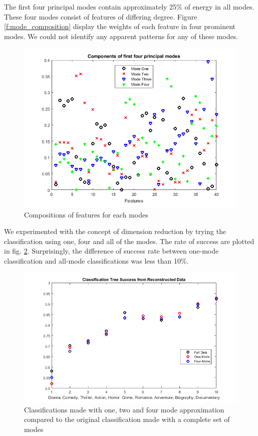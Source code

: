 \documentclass[letterpaper, 10 pt, conference]{ieeeconf}  %
\begin{document}
The first four principal modes contain approximately 25\% of energy in all modes. These four modes consist of features of differing degree. Figure \ref{f:mode_composition} display the weights of each feature in four prominent modes. We could not identify any apparent patterns for any of these modes.
\begin{figure}[h]
	\centering
	\includegraphics[width=\columnwidth]{principalModes.png}
	\caption{Compositions of features for each modes}
	\label{f:mode_covar}
\end{figure}
We experimented with the concept of dimension reduction by trying the classification using one, four and all of the modes. The rate of success are plotted in fig. \ref{f:modal_redx}. Surprisingly, the difference of success rate between one-mode classification and all-mode classifications was less than 10\%.

\begin{figure}[h]
	\centering
	\includegraphics[width=\columnwidth]{reconstructionSuccess.png}
	\caption{Classifications made with one, two and four mode approximation compared to the original classification made with a complete set of modes} 
	\label{f:modal_redx}
\end{figure}
\end{document}
